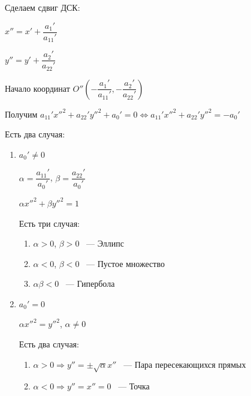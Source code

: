 \documentclass[twoside]{book}
\begin{document}
\begin{enumerate}
\begin{enumerate}
                    Сделаем сдвиг ДСК:

                    \(x'' = x' + \dfrac{a_1'}{a_{11}'}\)

                    \(y'' = y' + \dfrac{a_2'}{a_{22}'}\)

                    Начало координат \(O''\left(-\dfrac{a_1'}{a_{11}'}, -\dfrac{a_2'}{a_{22}'}\right)\)

                    Получим \(a_{11}' x''^2 + a_{22}' y''^2 + a_0' = 0 \Leftrightarrow a_{11}' x''^2 + a_{22}' y''^2 = -a_0'\)

                    Есть два случая:
                    \begin{enumerate}
                        \item \(a_0' \neq 0\)

                              \(\alpha = \dfrac{a_{11}'}{a_0'}\), \(\beta = \dfrac{a_{22}'}{a_0'}\)

                              \(\alpha x''^2 + \beta y''^2 = 1\)

                              Есть три случая:
                              \begin{enumerate}
                                  \item \(\alpha > 0\), \(\beta > 0\) ~--- Эллипс

                                  \item \(\alpha < 0\), \(\beta < 0\) ~--- Пустое множество

                                  \item \(\alpha \beta < 0\) ~---  Гипербола
                              \end{enumerate}
                        \item \(a_0' = 0\)

                              \(\alpha x''^2 = y''^2\), \(\alpha \neq 0\)

                              Есть два случая:
                              \begin{enumerate}
                                  \item \(\alpha > 0 \Rightarrow y'' = \pm \sqrt \alpha x''\) ~--- Пара пересекающихся прямых

                                  \item \(\alpha < 0 \Rightarrow y'' = x'' = 0\) ~--- Точка
                              \end{enumerate}
                    \end{enumerate}


\end{enumerate}
\end{enumerate}
\end{document}
